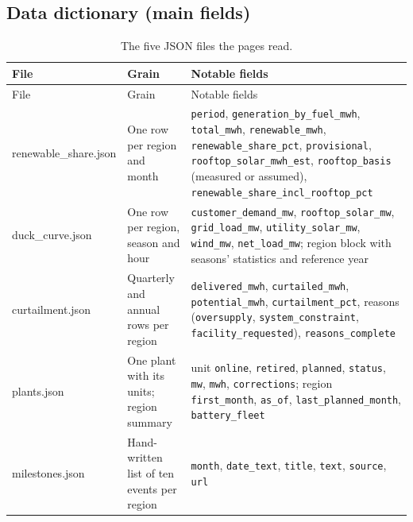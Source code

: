 \documentclass[11pt,a4paper]{article}
\begin{document}
\subsection{Data dictionary (main fields)}
{\footnotesize\setlength{\tabcolsep}{4pt}
\begin{longtable}{@{}>{\raggedright\arraybackslash}p{3.3cm}>{\raggedright\arraybackslash}p{3.9cm}>{\raggedright\arraybackslash}p{8.1cm}@{}}
\caption{The five JSON files the pages read.}\\
\toprule
File & Grain & Notable fields \\
\midrule
\endfirsthead
\toprule
File & Grain & Notable fields \\
\midrule
\endhead
\bottomrule
\endfoot
\bottomrule
\endlastfoot
renewable\_share.json & One row per region and month & \texttt{period}, \texttt{generation\_by\_fuel\_mwh}, \texttt{total\_mwh}, \texttt{renewable\_mwh}, \texttt{renewable\_share\_pct}, \texttt{provisional}, \texttt{rooftop\_solar\_mwh\_est}, \texttt{rooftop\_basis} (measured or assumed), \texttt{renewable\_share\_incl\_rooftop\_pct} \\
duck\_curve.json & One row per region, season and hour & \texttt{customer\_demand\_mw}, \texttt{rooftop\_solar\_mw}, \texttt{grid\_load\_mw}, \texttt{utility\_solar\_mw}, \texttt{wind\_mw}, \texttt{net\_load\_mw}; region block with seasons' statistics and reference year \\
curtailment.json & Quarterly and annual rows per region & \texttt{delivered\_mwh}, \texttt{curtailed\_mwh}, \texttt{potential\_mwh}, \texttt{curtailment\_pct}, reasons (\texttt{oversupply}, \texttt{system\_constraint}, \texttt{facility\_requested}), \texttt{reasons\_complete} \\
plants.json & One plant with its units; region summary & unit \texttt{online}, \texttt{retired}, \texttt{planned}, \texttt{status}, \texttt{mw}, \texttt{mwh}, \texttt{corrections}; region \texttt{first\_month}, \texttt{as\_of}, \texttt{last\_planned\_month}, \texttt{battery\_fleet} \\
milestones.json & Hand-written list of ten events per region & \texttt{month}, \texttt{date\_text}, \texttt{title}, \texttt{text}, \texttt{source}, \texttt{url} \\
\end{longtable}}

\appendix
\end{document}
